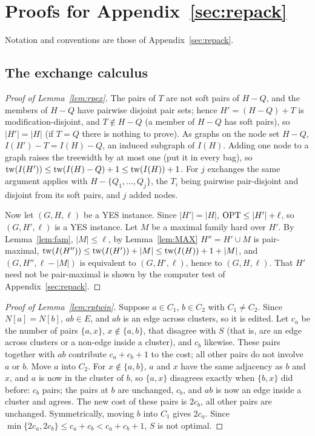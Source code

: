 \section{Proofs for Appendix~\ref{sec:repack}}\label{app:repack}
Notation and conventions are those of Appendix~\ref{sec:repack}.

\subsection{The exchange calculus}
\begin{proof}[Proof of Lemma~\ref{lem:rpex}]
The pairs of $T$ are not soft pairs of $H-Q$, and the members of $H-Q$ have pairwise disjoint pair sets; hence $H'=(H-Q)+T$ is modification-disjoint, and $T\notin H-Q$ (a member of $H-Q$ has soft pairs), so $|H'|=|H|$ (if $T=Q$ there is nothing to prove). As graphs on the node set $H-Q$, $I(H')-T=I(H)-Q$, an induced subgraph of $I(H)$. Adding one node to a graph raises the treewidth by at most one (put it in every bag), so $\mathrm{tw}(I(H'))\le\mathrm{tw}(I(H)-Q)+1\le\mathrm{tw}(I(H))+1$. For $j$ exchanges the same argument applies with $H-\{Q_1,\dots,Q_j\}$, the $T_i$ being pairwise pair-disjoint and disjoint from its soft pairs, and $j$ added nodes.

Now let $(G,H,\ell)$ be a YES instance. Since $|H'|=|H|$, $\mathrm{OPT}\le|H'|+\ell$, so $(G,H',\ell)$ is a YES instance. Let $M$ be a maximal family hard over $H'$. By Lemma~\ref{lem:fam}, $|M|\le\ell$, by Lemma~\ref{lem:MAX} $H''=H'\cup M$ is pair-maximal, $\mathrm{tw}(I(H''))\le\mathrm{tw}(I(H'))+|M|\le\mathrm{tw}(I(H))+1+|M|$, and $(G,H'',\ell-|M|)$ is equivalent to $(G,H',\ell)$, hence to $(G,H,\ell)$. That $H'$ need not be pair-maximal is shown by the computer test of Appendix~\ref{sec:repack}.
\end{proof}

\begin{proof}[Proof of Lemma~\ref{lem:rptwin}]
Suppose $a\in C_1$, $b\in C_2$ with $C_1\ne C_2$. Since $N[a]=N[b]$, $ab\in E$, and $ab$ is an edge across clusters, so it is edited. Let $c_a$ be the number of pairs $\{a,x\}$, $x\notin\{a,b\}$, that disagree with $S$ (that is, are an edge across clusters or a non-edge inside a cluster), and $c_b$ likewise. These pairs together with $ab$ contribute $c_a+c_b+1$ to the cost; all other pairs do not involve $a$ or $b$. Move $a$ into $C_2$. For $x\notin\{a,b\}$, $a$ and $x$ have the same adjacency as $b$ and $x$, and $a$ is now in the cluster of $b$, so $\{a,x\}$ disagrees exactly when $\{b,x\}$ did before: $c_b$ pairs; the pairs at $b$ are unchanged, $c_b$, and $ab$ is now an edge inside a cluster and agrees. The new cost of these pairs is $2c_b$, all other pairs are unchanged. Symmetrically, moving $b$ into $C_1$ gives $2c_a$. Since $\min\{2c_a,2c_b\}\le c_a+c_b<c_a+c_b+1$, $S$ is not optimal.
\end{proof}

